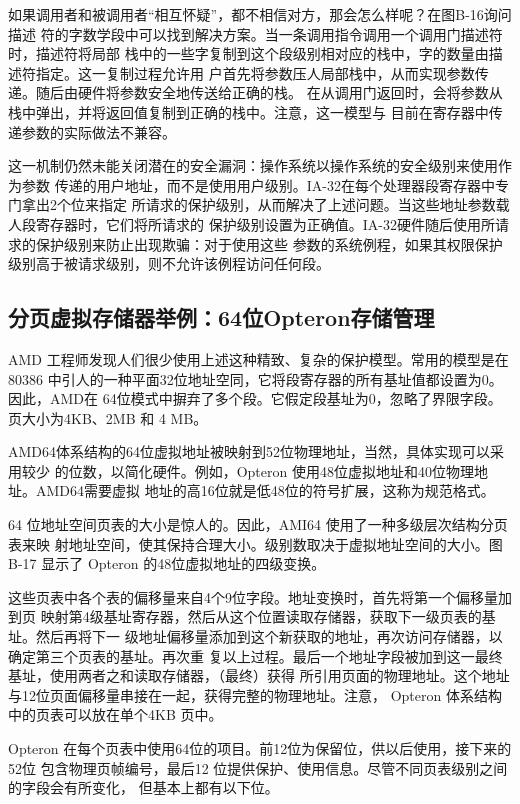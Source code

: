 如果调用者和被调用者“相互怀疑”，都不相信对方，那会怎么样呢？在图B-16询问描述
符的字数学段中可以找到解决方案。当一条调用指令调用一个调用门描述符时，描述符将局部
栈中的一些字复制到这个段级别相对应的栈中，字的数量由描述符指定。这一复制过程允许用
户首先将参数压人局部栈中，从而实现参数传递。随后由硬件将参数安全地传送给正确的栈。
在从调用门返回时，会将参数从栈中弹出，并将返回值复制到正确的栈中。注意，这一模型与
目前在寄存器中传递参数的实际做法不兼容。

这一机制仍然未能关闭潜在的安全漏洞：操作系统以操作系统的安全级别来使用作为参数
传递的用户地址，而不是使用用户级别。IA-32在每个处理器段寄存器中专门拿出2个位来指定
所请求的保护级别，从而解决了上述问题。当这些地址参数载人段寄存器时，它们将所请求的
保护级别设置为正确值。IA-32硬件随后使用所请求的保护级别来防止出现欺骗：对于使用这些
参数的系统例程，如果其权限保护级别高于被请求级别，则不允许该例程访问任何段。

\subsection{分页虚拟存储器举例：64位Opteron存储管理}

AMD 工程师发现人们很少使用上述这种精致、复杂的保护模型。常用的模型是在80386
中引人的一种平面32位地址空同，它将段寄存器的所有基址值都设置为0。因此，AMD在
64位模式中摒弃了多个段。它假定段基址为0，忽略了界限字段。页大小为4KB、2MB 和
4 MB。

AMD64体系结构的64位虚拟地址被映射到52位物理地址，当然，具体实现可以采用较少
的位数，以简化硬件。例如，Opteron 使用48位虚拟地址和40位物理地址。AMD64需要虚拟
地址的高16位就是低48位的符号扩展，这称为规范格式。

64 位地址空间页表的大小是惊人的。因此，AMI64 使用了一种多级层次结构分页表来映
射地址空间，使其保持合理大小。级别数取决于虚拟地址空间的大小。图B-17 显示了 Opteron
的48位虚拟地址的四级变换。

这些页表中各个表的偏移量来自4个9位字段。地址变换时，首先将第一个偏移量加到页
映射第4级基址寄存器，然后从这个位置读取存储器，获取下一级页表的基址。然后再将下一
级地址偏移量添加到这个新获取的地址，再次访问存储器，以确定第三个页表的基址。再次重
复以上过程。最后一个地址字段被加到这一最终基址，使用两者之和读取存储器，（最终）获得
所引用页面的物理地址。这个地址与12位页面偏移量串接在一起，获得完整的物理地址。注意，
Opteron 体系结构中的页表可以放在单个4KB 页中。

Opteron 在每个页表中使用64位的项目。前12位为保留位，供以后使用，接下来的52位
包含物理页帧编号，最后12 位提供保护、使用信息。尽管不同页表级别之间的字段会有所变化，
但基本上都有以下位。

